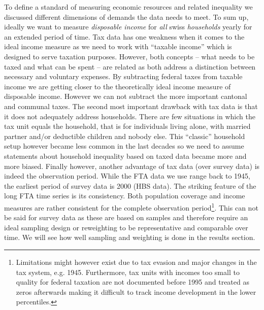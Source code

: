 \documentclass[twoside]{article}\usepackage[]{graphicx}\usepackage[]{color}
\begin{document}
\begin{multicols}{2}
To define a standard of measuring economic resources and related inequality we discussed different dimensions of demands the data needs to meet. To sum up, ideally we want to measure \textit{disposable income} for \textit{all} swiss \textit{households} yearly for an extended period of time. Tax data has one weakness when it comes to the ideal income measure as we need to work with ``taxable income'' which is designed to serve taxation purposes. However, both concepts -- what needs to be taxed and what can be spent -- are related as both address a distinction between necessary and voluntary expenses. By subtracting federal taxes from taxable income we are getting closer to the theoretically ideal income measure of disposable income. However we can not subtract the more important cantonal and communal taxes. 
The second most important drawback with tax data is that it does not adequately address households. There are few situations in which the tax unit equals the household, that is for individuals living alone, with married partner and/or deductible children and nobody else. This ``classic'' household setup however became less common in the last decades so we need to assume statements about household inequality based on taxed data became more and more biased. 
Finally however, another advantage of tax data (over survey data) is indeed the observation period. While the FTA data we use range back to 1945, the earliest period of survey data is 2000 (HBS data). The striking feature of the long FTA time series is its consistency. Both population coverage and income measures are rather consistent for the complete observation period\footnote{Limitations might however exist due to tax evasion and major changes in the tax system, e.g. 1945. Furthermore, tax units with incomes too small to quality for federal taxation are not documented before 1995 and treated as zeros afterwards making it difficult to track income development in the lower percentiles.}. This can not be said for survey data as these are based on samples and therefore require an ideal sampling design or reweighting to be representative and comparable over time. We will see how well sampling and weighting is done in the results section.








\end{multicols}
\end{document}
